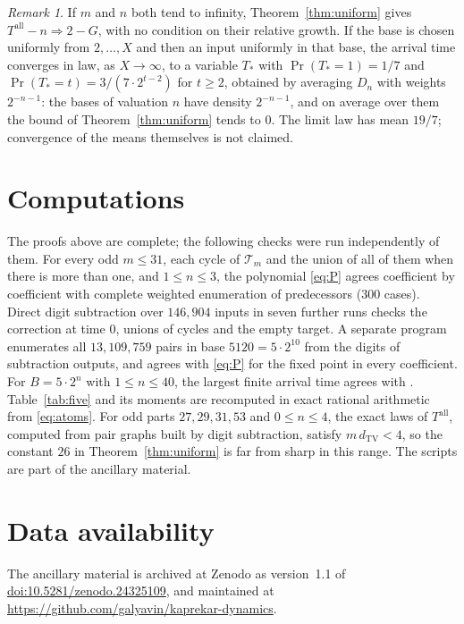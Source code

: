 \documentclass[11pt]{amsart}
\theoremstyle{remark}
\newtheorem*{remark}{Remark}
\newcommand{\T}{\mathcal{T}}
\newcommand{\dtv}{d_{\mathrm{TV}}}
\begin{document}
\begin{remark}
If $m$ and $n$ both tend to infinity, Theorem~\ref{thm:uniform} gives $T^{\mathrm{all}}-n\Rightarrow2-G$, with no condition on their relative growth. If the base is chosen uniformly from $2,\dots,X$ and then an input uniformly in that base, the arrival time converges in law, as $X\to\infty$, to a variable $T_*$ with $\Pr(T_*=1)=1/7$ and $\Pr(T_*=t)=3/(7\cdot2^{t-2})$ for $t\ge2$, obtained by averaging $D_n$ with weights $2^{-n-1}$: the bases of valuation $n$ have density $2^{-n-1}$, and on average over them the bound of Theorem~\ref{thm:uniform} tends to $0$. The limit law has mean $19/7$; convergence of the means themselves is not claimed.
\end{remark}

\section{Computations}

The proofs above are complete; the following checks were run independently of them. For every odd $m\le31$, each cycle of $\T_m$ and the union of all of them when there is more than one, and $1\le n\le3$, the polynomial \eqref{eq:P} agrees coefficient by coefficient with complete weighted enumeration of predecessors ($300$ cases). Direct digit subtraction over $146{,}904$ inputs in seven further runs checks the correction at time $0$, unions of cycles and the empty target. A separate program enumerates all $13{,}109{,}759$ pairs in base $5120=5\cdot2^{10}$ from the digits of subtraction outputs, and agrees with \eqref{eq:P} for the fixed point in every coefficient. For $B=5\cdot2^n$ with $1\le n\le40$, the largest finite arrival time agrees with \cite[Theorem~1]{DZ}. Table~\ref{tab:five} and its moments are recomputed in exact rational arithmetic from \eqref{eq:atoms}. For odd parts $27,29,31,53$ and $0\le n\le4$, the exact laws of $T^{\mathrm{all}}$, computed from pair graphs built by digit subtraction, satisfy $m\,\dtv<4$, so the constant $26$ in Theorem~\ref{thm:uniform} is far from sharp in this range. The scripts are part of the ancillary material.

\section*{Data availability}
The ancillary material is archived at Zenodo as version~1.1 of \href{https://doi.org/10.5281/zenodo.24325109}{doi:10.5281/zenodo.24325109}, and maintained at \url{https://github.com/galyavin/kaprekar-dynamics}.
\end{document}
